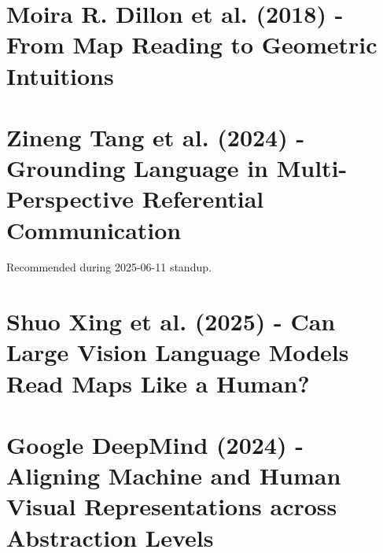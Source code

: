 \documentclass[12pt, letterpaper]{article}
\begin{document}
\begin{spacing}{1.10}
\section[Dillon et al. - From Map Reading to Geometric Intuitions]{Moira R. Dillon et al. (2018) - From Map Reading to Geometric Intuitions \cite{Dillon2018FromMapReading}}
\label{sec:Dillon 2018 From Map Reading to Geometric Intuitions}
\leavevmode\par


\section[Tang et al. - Grounding Language in Multi-Perspective Referential Communication]{Zineng Tang et al. (2024) - Grounding Language in Multi-Perspective Referential Communication \cite{Tang2024groundinglang}}
\label{sec:Tang 2024 Grounding Language}
\leavevmode\par\noindent
Recommended during 2025-06-11 standup.

\section[Xing et al. - Can Large Vision Language Models Read Maps Like a Human?]{Shuo Xing et al. (2025) - Can Large Vision Language Models Read Maps Like a Human?}


\section[Google DeepMind - Aligning Machine and Human Visual Representations]{Google DeepMind (2024) - Aligning Machine and Human Visual Representations across Abstraction Levels}



\end{spacing}
\end{document}
